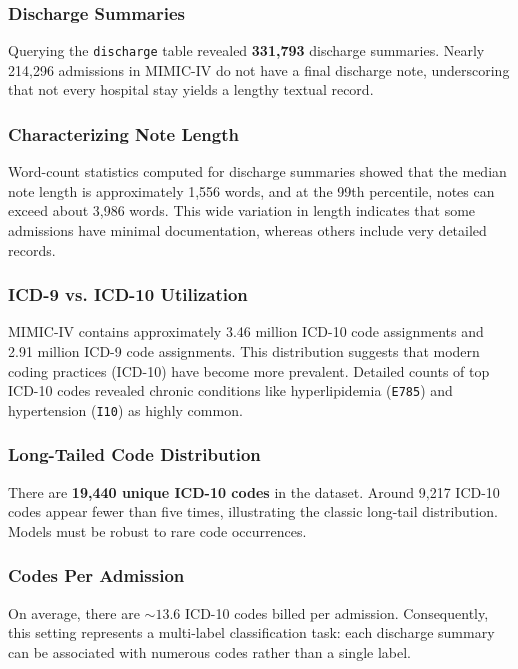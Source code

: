 \subsubsection{Discharge Summaries}
\noindent
Querying the \texttt{discharge} table revealed \textbf{331,793} discharge summaries. Nearly 214,296 admissions in MIMIC-IV do not have a final discharge note, underscoring that not every hospital stay yields a lengthy textual record.

\subsubsection{Characterizing Note Length}
\noindent
Word-count statistics computed for discharge summaries showed that the median note length is approximately 1{,}556 words, and at the 99th percentile, notes can exceed about 3{,}986 words. This wide variation in length indicates that some admissions have minimal documentation, whereas others include very detailed records.

\subsubsection{ICD-9 vs. ICD-10 Utilization}
\noindent
MIMIC-IV contains approximately 3.46 million ICD-10 code assignments and 2.91 million ICD-9 code assignments. This distribution suggests that modern coding practices (ICD-10) have become more prevalent. Detailed counts of top ICD-10 codes revealed chronic conditions like hyperlipidemia (\texttt{E785}) and hypertension (\texttt{I10}) as highly common.

\subsubsection{Long-Tailed Code Distribution}
\noindent
There are \textbf{19,440 unique ICD-10 codes} in the dataset. Around 9,217 ICD-10 codes appear fewer than five times, illustrating the classic long-tail distribution. Models must be robust to rare code occurrences.

\subsubsection{Codes Per Admission}
\noindent
On average, there are \(\sim13.6\) ICD-10 codes billed per admission. Consequently, this setting represents a multi-label classification task: each discharge summary can be associated with numerous codes rather than a single label.


